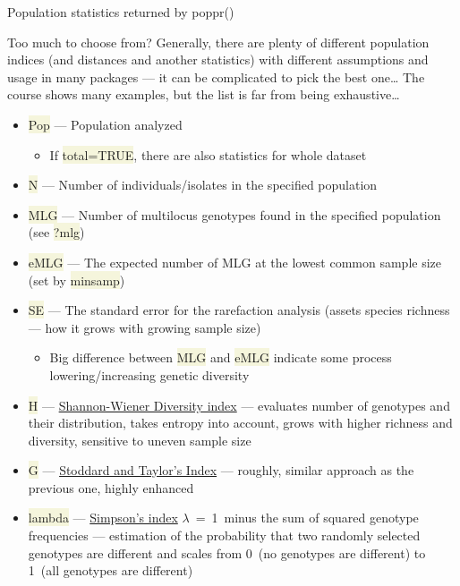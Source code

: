 \documentclass[compress, ucs, xelatex, 11pt, xcolor=svgnames, aspectratio=169,
	hyperref={
		bookmarks=true,
		unicode=true,
		colorlinks=true,
		pdftitle={Molecular data in R},
		plainpages=false,
		pdfauthor={Vojtech Zeisek},
		pdfsubject={Course about phylogeny and evolution in R},
		pdfcreator={XeLaTeX},
		pdfkeywords={R, evolution, phylogeny, molecular data},
		linkcolor=Crimson, %
		anchorcolor=Magenta, %
		citecolor=Magenta, %
		filecolor=Magenta, %
		menucolor=Magenta, %
		urlcolor=DodgerBlue, %
		pdftex},
	url={hyphens, lowtilde} %
	]{beamer}
\renewcommand{\texttt}[1]{\colorbox{Beige}{{\ttfamily #1}}}
\begin{document}
\begin{frame}[allowframebreaks]{Population statistics returned by poppr()}
	\begin{block}{Too much to choose from?}
		Generally, there are plenty of different population indices (and distances and another statistics) with different assumptions and usage in many packages --- it can be complicated to pick the best one\ldots{ }The course shows many examples, but the list is far from being exhaustive\ldots
	\end{block}
	\begin{itemize}
		\item \texttt{Pop} --- Population analyzed
		\begin{itemize}
			\item If \texttt{total=TRUE}, there are also statistics for whole dataset
		\end{itemize}
		\item \texttt{N} --- Number of individuals/isolates in the specified population
		\item \texttt{MLG} --- Number of multilocus genotypes found in the specified population (see \texttt{?mlg})
		\item \texttt{eMLG} --- The expected number of MLG at the lowest common sample size (set by \texttt{minsamp})
		\item \texttt{SE} --- The standard error for the rarefaction analysis (assets species richness --- how it grows with growing sample size)
		\begin{itemize}
			\item Big difference between \texttt{MLG} and \texttt{eMLG} indicate some process lowering/increasing genetic diversity
		\end{itemize}
		\item \texttt{H} --- \href{https://en.wikipedia.org/wiki/Diversity_index\#Shannon_index}{Shannon-Wiener Diversity index} --- evaluates number of genotypes and their distribution, takes entropy into account, grows with higher richness and diversity, sensitive to uneven sample size
		\item \texttt{G} --- \href{https://www.genetics.org/content/118/4/705}{Stoddard and Taylor's Index} --- roughly, similar approach as the previous one, highly enhanced
		\item \texttt{lambda} --- \href{https://en.wikipedia.org/wiki/Diversity_index\#Simpson_index}{Simpson's index} $\lambda$~=~1~minus the sum of squared genotype frequencies --- estimation of the probability that two randomly selected genotypes are different and scales from 0~(no genotypes are different) to 1~(all genotypes are different)

\end{itemize}
\end{frame}
\end{document}
